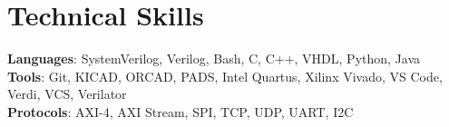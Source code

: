 \documentclass[letterpaper,11pt]{article}
\begin{document}
    \section{Technical Skills}
     \begin{itemize}[leftmargin=0.15in, label={}]
        \small{\item{
        \textbf{Languages}{: SystemVerilog, Verilog, Bash, C, C++, VHDL, Python, Java}\\ 
        \vspace{2pt}
        \textbf{Tools}{: Git, KICAD, ORCAD, PADS, Intel Quartus, Xilinx Vivado, VS Code, Verdi, VCS, Verilator} \\
        \vspace{2pt}
        \textbf{Protocols}{: AXI-4, AXI Stream, SPI, TCP, UDP, UART, I2C} \\
        }}
     \end{itemize}

    \vspace{-15pt}

    

\end{document}
